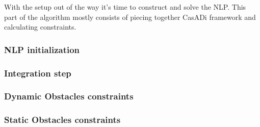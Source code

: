 With the setup out of the way it's time to construct and solve the \gls{NLP}. This part of the algorithm
mostly consists of piecing together CasADi framework and calculating constraints.

\subsubsection{NLP initialization}

\subsubsection{Integration step}

\subsubsection{Dynamic Obstacles constraints}

\subsubsection{Static Obstacles constraints}

